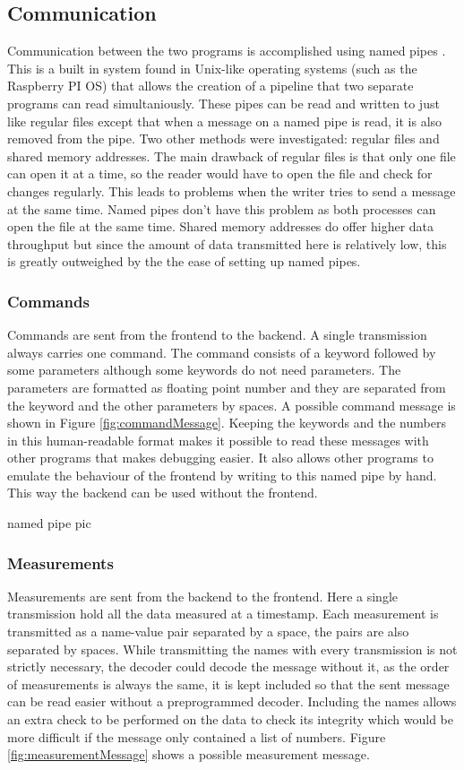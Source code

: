 \documentclass[12pt]{article}
\begin{document}
\subsection{Communication}
Communication between the two programs is accomplished using named pipes \cite{MKFIFO}. This is a built in system found in Unix-like operating systems (such as the Raspberry PI OS) that allows the creation of a pipeline that two separate programs can read simultaniously. These pipes can be read and written to just like regular files except that when a message on a named pipe is read, it is also removed from the pipe. 
Two other methods were investigated: regular files and shared memory addresses. The main drawback of regular files is that only one file can open it at a time, so the reader would have to open the file and check for changes regularly. This leads to problems when the writer tries to send a message at the same time. Named pipes don't have this problem as both processes can open the file at  the same time. 
Shared memory addresses do offer higher data throughput but since the amount of data transmitted here is relatively low, this is greatly outweighed by the the ease of setting up named pipes. 


\subsubsection{Commands}
Commands are sent from the frontend to the backend. A single transmission always carries one command. The command consists of a keyword followed by some parameters although some keywords do not need parameters. The parameters are formatted as floating point number and they are separated from the keyword and the other parameters by spaces. A possible command message is shown in Figure \ref{fig:commandMessage}. Keeping the keywords and the numbers in this human-readable format makes it possible to read these messages with other programs that makes debugging easier. It also allows other programs to emulate the behaviour of the frontend by writing to this named pipe by hand. This way the backend can be used without the frontend. 

\todo named pipe pic

\subsubsection{Measurements}
Measurements are sent from the backend to the frontend. Here a single transmission hold all the data measured at a timestamp. Each measurement is transmitted as a name-value pair separated by a space, the pairs are also separated by spaces. While transmitting the names with every transmission is not strictly necessary, the decoder could decode the message without it, as the order of measurements is always the same, it is kept included so that the sent message can be read easier without a preprogrammed decoder. Including the names allows an extra check to be performed on the data to check its integrity which would be more difficult if the message only contained a list of numbers. Figure \ref{fig:measurementMessage} shows a possible measurement message.
\end{document}
